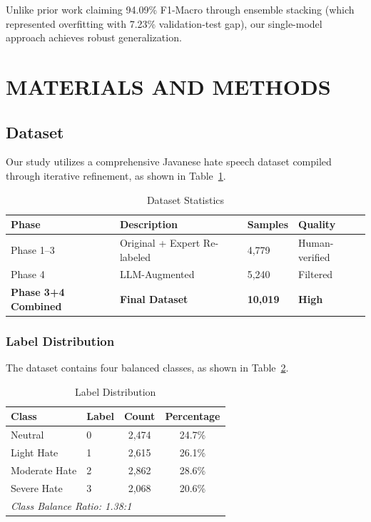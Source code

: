 \documentclass[10pt,journal]{IEEEtran}
\begin{document}
Unlike prior work claiming 94.09\% F1-Macro through ensemble stacking (which represented overfitting with 7.23\% validation-test gap), our single-model approach achieves robust generalization.

\section{MATERIALS AND METHODS}

\subsection{Dataset}

Our study utilizes a comprehensive Javanese hate speech dataset compiled through iterative refinement, as shown in Table~\ref{tab:dataset}.

\begin{table}[H]
\centering
\caption{Dataset Statistics}
\label{tab:dataset}
\begin{tabular}{@{}llll@{}}
\toprule
\textbf{Phase} & \textbf{Description} & \textbf{Samples} & \textbf{Quality} \\ \midrule
Phase 1--3     & Original + Expert Re-labeled & 4,779 & Human-verified \\
Phase 4        & LLM-Augmented & 5,240 & Filtered \\
\textbf{Phase 3+4 Combined} & \textbf{Final Dataset} & \textbf{10,019} & \textbf{High} \\ \bottomrule
\end{tabular}
\end{table}

\subsubsection{Label Distribution}

The dataset contains four balanced classes, as shown in Table~\ref{tab:labels}.

\begin{table}[H]
\centering
\caption{Label Distribution}
\label{tab:labels}
\begin{tabular}{@{}llcc@{}}
\toprule
\textbf{Class} & \textbf{Label} & \textbf{Count} & \textbf{Percentage} \\ \midrule
Neutral & 0 & 2,474 & 24.7\% \\
Light Hate & 1 & 2,615 & 26.1\% \\
Moderate Hate & 2 & 2,862 & 28.6\% \\
Severe Hate & 3 & 2,068 & 20.6\% \\ \midrule
\multicolumn{3}{l}{\textit{Class Balance Ratio: 1.38:1}} & \\ \bottomrule
\end{tabular}
\end{table}
\end{document}
